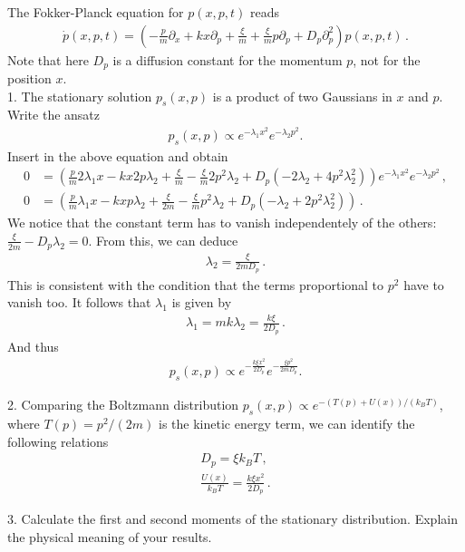 The Fokker-Planck equation for $p(x,p,t)$ reads
\begin{align}
\dot{p}(x,p,t) = \left( - \frac{p}{m} \partial_x + kx \partial_p + \frac{\xi}{m} + \frac{\xi}{m} p \partial_p + D_p \partial^2_p \right) p(x,p,t) \,.
\end{align}
Note that here $D_p$ is a diffusion constant for the momentum $p$, not for the position $x$. \\

1. The stationary solution $p_s(x,p)$ is a product of two Gaussians in $x$ and $p$. Write the ansatz
\begin{align}
p_s(x,p) \propto e^{-\lambda_1 x^2}e^{-\lambda_2 p^2}.
\end{align}
Insert in the above equation and obtain
\begin{align}
0 &= \left( \frac{p}{m} 2\lambda_1 x - kx 2p\lambda_2 + \frac{\xi}{m} - \frac{\xi}{m} 2p^2\lambda_2 + D_p (-2\lambda_2 + 4p^2\lambda_2^2) \right) e^{-\lambda_1 x^2}e^{-\lambda_2 p^2} \,, \\
0 &= \left( \frac{p}{m} \lambda_1 x - kx p\lambda_2 + \frac{\xi}{2m} - \frac{\xi}{m} p^2\lambda_2 + D_p (-\lambda_2 + 2p^2\lambda_2^2) \right) \,.
\end{align}
We notice that the constant term has to vanish independentely of the others: $\frac{\xi}{2m} - D_p \lambda_2 = 0$. From this, we can deduce
\begin{align}
\lambda_2 = \frac{\xi}{2mD_p} \,.
\end{align}
This is consistent with the condition that the terms proportional to $p^2$ have to vanish too.
It follows that $\lambda_1$ is given by
\begin{align}
\lambda_1 = mk\lambda_2 = \frac{k\xi}{2D_p} \,.
\end{align}
And thus
\begin{align}
p_s(x,p) \propto e^{-\frac{k\xi x^2}{2D_p}}e^{-\frac{\xi p^2}{2mD_p}}.
\end{align}

2. Comparing the Boltzmann distribution $p_s(x,p) \propto e^{-(T(p)+U(x))/(k_B T)}$, where $T(p) = p^2/(2m)$ is the kinetic energy term, we can identify the following relations
\begin{align}
D_p = \xi k_B T \,, \\
\frac{U(x)}{k_B T} = \frac{k\xi x^2}{2D_p} \,.
\end{align}

3. Calculate the first and second moments of the stationary distribution. Explain the physical meaning of your results.